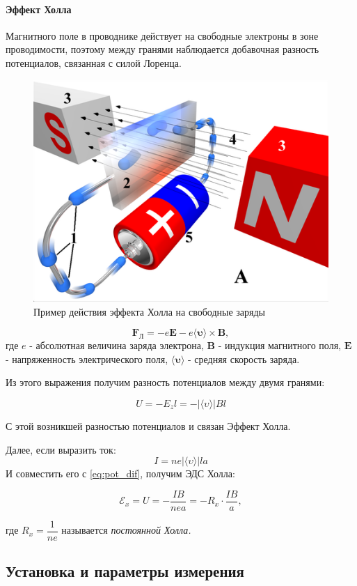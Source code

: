 \documentclass{physlab}
\begin{document}
\paragraph{Эффект Холла} 
Магнитного поле в проводнике действует на свободные электроны в зоне проводимости, поэтому между гранями наблюдается добавочная разность потенциалов, связанная с силой Лоренца. 


\begin {figure}[H]
	\begin{center}
		\includegraphics[width = 0.35 \textwidth]{Hall_effect}
		\caption{Пример действия эффекта Холла на свободные заряды}
	\end{center}
\end {figure}



$$\boldsymbol{F_\text{Л}}  = -e \boldsymbol{E} - e \langle \boldsymbol{\upsilon} \rangle \times \boldsymbol{B},$$
где $e$ - абсолютная величина заряда электрона, $\boldsymbol{B}$ - индукция магнитного поля, $\boldsymbol{E}$ - напряженность электрического поля, $ \langle \boldsymbol{\upsilon} \rangle$ - средняя скорость заряда.

Из этого выражения получим разность потенциалов между двумя гранями:

\begin{equation}
U = -E_zl = - | \langle \upsilon \rangle | B l
\label{eq:pot_dif}
\end{equation}

С этой возникшей разностью потенциалов и связан Эффект Холла.

Далее, если выразить ток:
$$ I = ne |\langle \upsilon \rangle |  l a$$
И совместить его с \ref{eq:pot_dif}, получим ЭДС Холла:

\begin{equation}
\mathscr{E}_x = U = - \dfrac{IB}{nea} = -R_x \cdot \dfrac{IB}{a},
\label{eq: Hall}
\end{equation}

где $R_x = \dfrac{1}{ne}$ называется \textit{постоянной Холла.}

\subsection*{Установка и параметры измерения}
\end{document}
